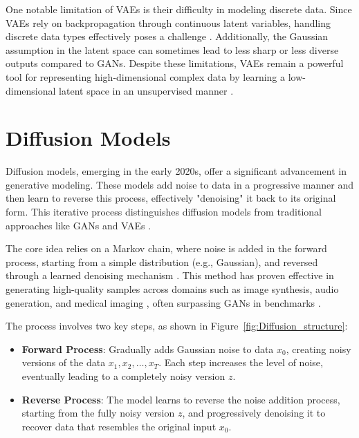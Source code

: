 One notable limitation of VAEs is their difficulty in modeling discrete data. Since VAEs rely on backpropagation through continuous latent variables, handling discrete data types effectively poses a challenge \citep{10.48550/arxiv.1909.13062}. Additionally, the Gaussian assumption in the latent space can sometimes lead to less sharp or less diverse outputs compared to GANs. Despite these limitations, VAEs remain a powerful tool for representing high-dimensional complex data by learning a low-dimensional latent space in an unsupervised manner \citep{10.48550/arxiv.2106.06500}.


\section{Diffusion Models}

Diffusion models, emerging in the early 2020s, offer a significant advancement in generative modeling. These models add noise to data in a progressive manner and then learn to reverse this process, effectively "denoising" it back to its original form. This iterative process distinguishes diffusion models from traditional approaches like GANs and VAEs \citep{10.48550/arxiv.2105.05233}.

The core idea relies on a Markov chain, where noise is added in the forward process, starting from a simple distribution (e.g., Gaussian), and reversed through a learned denoising mechanism \citep{10.48550/arxiv.2009.09761}\citep{10.48550/arxiv.2206.05564}. This method has proven effective in generating high-quality samples across domains such as image synthesis, audio generation, and medical imaging \citep{10.48550/arxiv.2201.11972}\citep{10.48550/arxiv.2211.00611}, often surpassing GANs in benchmarks \citep{10.48550/arxiv.2105.05233}\citep{10.48550/arxiv.2201.00308}.

The process involves two key steps, as shown in Figure~\ref{fig:Diffusion_structure}:
\begin{itemize}
  \item \textbf{Forward Process}: Gradually adds Gaussian noise to data \(x_0\), creating noisy versions of the data \(x_1, x_2, \dots, x_T\). Each step increases the level of noise, eventually leading to a completely noisy version \(z\).
  \item \textbf{Reverse Process}: The model learns to reverse the noise addition process, starting from the fully noisy version \(z\), and progressively denoising it to recover data that resembles the original input \(x_0\).
\end{itemize}


